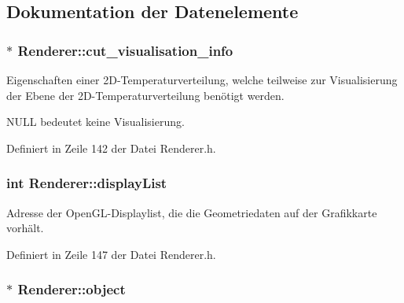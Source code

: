 \subsection{Dokumentation der Datenelemente}
\hypertarget{classRenderer_a119b7d1e3eb740a118e269758dd1a906}{
\subsubsection[{cut\-\_\-visualisation\-\_\-info}]{$\ast$ Renderer\-::cut\-\_\-visualisation\-\_\-info\hspace{0.3cm}{\ttfamily [private]}}}\label{classRenderer_a119b7d1e3eb740a118e269758dd1a906}


Eigenschaften einer 2\-D-\/\-Temperaturverteilung, welche teilweise zur Visualisierung der Ebene der 2\-D-\/\-Temperaturverteilung benötigt werden. 

N\-U\-L\-L bedeutet keine Visualisierung. 

Definiert in Zeile 142 der Datei Renderer.\-h.

\hypertarget{classRenderer_a165ec913fa058d0a38f5e7b7635adfd2}{
\subsubsection[{display\-List}]{\setlength{\rightskip}{0pt plus 5cm}int Renderer\-::display\-List\hspace{0.3cm}{\ttfamily [private]}}}\label{classRenderer_a165ec913fa058d0a38f5e7b7635adfd2}


Adresse der Open\-G\-L-\/\-Displaylist, die die Geometriedaten auf der Grafikkarte vorhält. 



Definiert in Zeile 147 der Datei Renderer.\-h.

\hypertarget{classRenderer_a4ad4a42fe6bfd32ff3ef4bb1d59f8f96}{
\subsubsection[{object}]{$\ast$ Renderer\-::object\hspace{0.3cm}{\ttfamily [private]}}}\label{classRenderer_a4ad4a42fe6bfd32ff3ef4bb1d59f8f96}


